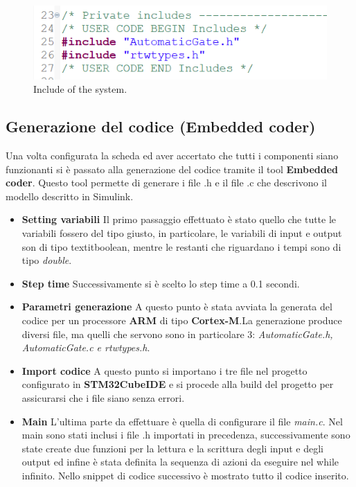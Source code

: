 \documentclass[12pt]{article}
\begin{document}
    \begin{figure}[H]
        \centering
        \includegraphics[width=1\textwidth]{snippet/include.png}
        \caption{Include of the system.}
    \end{figure}

\newpage
\subsection{Generazione del codice (Embedded coder)}

Una volta configurata la scheda ed aver accertato che tutti i componenti siano funzionanti si è passato alla generazione del codice tramite il tool \textbf{Embedded coder}. Questo tool permette di generare i file .h e il file .c che descrivono il modello descritto in Simulink.
\begin{itemize}
    \item {\textbf{Setting variabili}} Il primo passaggio effettuato è stato quello che tutte le variabili fossero del tipo giusto, in particolare, le variabili di input e output son di tipo textit{boolean}, mentre le restanti che riguardano i tempi sono di tipo \textit{double}.
    \item {\textbf{Step time}} Successivamente si è scelto lo step time a 0.1 secondi.
    \item {\textbf{Parametri generazione}} A questo punto è stata avviata la generata del codice per un processore \textbf{ARM} di tipo \textbf{Cortex-M}.La generazione produce diversi file, ma quelli che servono sono in particolare 3: \textit{AutomaticGate.h, AutomaticGate.c e rtwtypes.h}.
    \item {\textbf{Import codice}} A questo punto si importano i tre file nel progetto configurato in \textbf{STM32CubeIDE} e si procede alla build del progetto per assicurarsi che i file siano senza errori.
    \item {\textbf{Main}} L'ultima parte da effettuare è quella di configurare il file \textit{main.c}. Nel main sono stati inclusi i file .h importati in precedenza, successivamente sono state create due funzioni per la lettura e la scrittura degli input e degli output ed infine è stata definita la sequenza di azioni da eseguire nel while infinito. Nello snippet di codice successivo è mostrato tutto il codice inserito.
\end{itemize}
\end{document}
